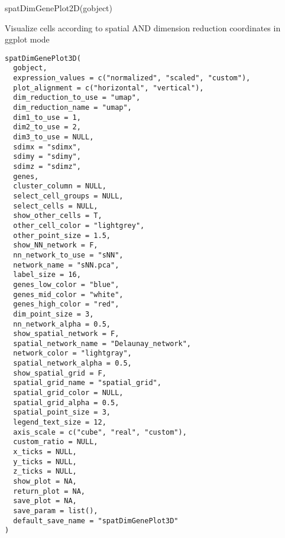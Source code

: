 \documentclass[a4paper]{book}
\begin{document}
%
\begin{Examples}
\begin{ExampleCode}
    spatDimGenePlot2D(gobject)
\end{ExampleCode}
\end{Examples}
%
\begin{Description}\relax
Visualize cells according to spatial AND dimension reduction coordinates in ggplot mode
\end{Description}
%
\begin{Usage}
\begin{verbatim}
spatDimGenePlot3D(
  gobject,
  expression_values = c("normalized", "scaled", "custom"),
  plot_alignment = c("horizontal", "vertical"),
  dim_reduction_to_use = "umap",
  dim_reduction_name = "umap",
  dim1_to_use = 1,
  dim2_to_use = 2,
  dim3_to_use = NULL,
  sdimx = "sdimx",
  sdimy = "sdimy",
  sdimz = "sdimz",
  genes,
  cluster_column = NULL,
  select_cell_groups = NULL,
  select_cells = NULL,
  show_other_cells = T,
  other_cell_color = "lightgrey",
  other_point_size = 1.5,
  show_NN_network = F,
  nn_network_to_use = "sNN",
  network_name = "sNN.pca",
  label_size = 16,
  genes_low_color = "blue",
  genes_mid_color = "white",
  genes_high_color = "red",
  dim_point_size = 3,
  nn_network_alpha = 0.5,
  show_spatial_network = F,
  spatial_network_name = "Delaunay_network",
  network_color = "lightgray",
  spatial_network_alpha = 0.5,
  show_spatial_grid = F,
  spatial_grid_name = "spatial_grid",
  spatial_grid_color = NULL,
  spatial_grid_alpha = 0.5,
  spatial_point_size = 3,
  legend_text_size = 12,
  axis_scale = c("cube", "real", "custom"),
  custom_ratio = NULL,
  x_ticks = NULL,
  y_ticks = NULL,
  z_ticks = NULL,
  show_plot = NA,
  return_plot = NA,
  save_plot = NA,
  save_param = list(),
  default_save_name = "spatDimGenePlot3D"
)
\end{verbatim}
\end{Usage}
%
\end{document}
